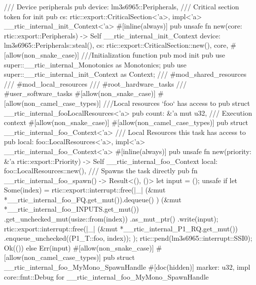 {{        /// Device peripherals
        pub device: lm3s6965::Peripherals,
        /// Critical section token for init
        pub cs: rtic::export::CriticalSection<'a>,
    }
    impl<'a> __rtic_internal_init_Context<'a> {
        #[inline(always)]
        pub unsafe fn new(core: rtic::export::Peripherals) -> Self {
            __rtic_internal_init_Context {
                device: lm3s6965::Peripherals::steal(),
                cs: rtic::export::CriticalSection::new(),
                core,
            }
        }
    }
    #[allow(non_snake_case)]
    ///Initialization function
    pub mod init {
        pub use super::__rtic_internal_Monotonics as Monotonics;
        pub use super::__rtic_internal_init_Context as Context;
    }
    /// #mod_shared_resources
    /// #mod_local_resources
    /// #root_hardware_tasks
    /// #user_software_tasks
    #[allow(non_snake_case)]
    #[allow(non_camel_case_types)]
    ///Local resources `foo` has access to
    pub struct __rtic_internal_fooLocalResources<'a> {
        pub count: &'a mut u32,
    }
    /// Execution context
    #[allow(non_snake_case)]
    #[allow(non_camel_case_types)]
    pub struct __rtic_internal_foo_Context<'a> {
        /// Local Resources this task has access to
        pub local: foo::LocalResources<'a>,
    }
    impl<'a> __rtic_internal_foo_Context<'a> {
        #[inline(always)]
        pub unsafe fn new(priority: &'a rtic::export::Priority) -> Self {
            __rtic_internal_foo_Context {
                local: foo::LocalResources::new(),
            }
        }
    }
    /// Spawns the task directly
    pub fn __rtic_internal_foo_spawn() -> Result<(), ()> {
        let input = ();
        unsafe {
            if let Some(index) = rtic::export::interrupt::free(|_| {
                (&mut *__rtic_internal_foo_FQ.get_mut()).dequeue()
            }) {
                (&mut *__rtic_internal_foo_INPUTS.get_mut())
                    .get_unchecked_mut(usize::from(index))
                    .as_mut_ptr()
                    .write(input);
                rtic::export::interrupt::free(|_| {
                    (&mut *__rtic_internal_P1_RQ.get_mut())
                        .enqueue_unchecked((P1_T::foo, index));
                });
                rtic::pend(lm3s6965::interrupt::SSI0);
                Ok(())
            } else {
                Err(input)
            }
        }
    }
    #[allow(non_snake_case)]
    #[allow(non_camel_case_types)]
    pub struct __rtic_internal_foo_MyMono_SpawnHandle {
        #[doc(hidden)]
        marker: u32,
    }
    impl core::fmt::Debug for __rtic_internal_foo_MyMono_SpawnHandle {
}}
